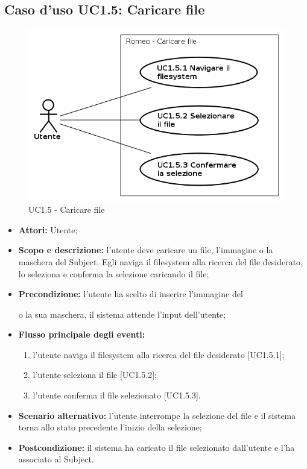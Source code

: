 \subsection{Caso d'uso UC1.5: Caricare file}
\begin{figure}[!h]
\begin{center}
\includegraphics[scale=0.6]{./img/Use_Case/UC1_5}
\caption{UC1.5 - Caricare file}
\end{center}
\end{figure}
\begin{itemize}
\item \textbf{Attori:} Utente;
\item \textbf{Scopo e descrizione:} l'utente deve caricare un file, l'immagine o la maschera\glossario{} del Subject\glossario{}. Egli naviga il filesystem alla ricerca del file desiderato, lo seleziona e conferma la selezione caricando il file;
\item \textbf{Precondizione:} l'utente ha scelto di inserire l'immagine del \subject{} o la sua maschera\glossario{}, il sistema attende l'input dell'utente;
\item \textbf{Flusso principale degli eventi:}
\begin{enumerate}
\item l'utente naviga il filesystem alla ricerca del file desiderato [UC1.5.1];
\item l'utente seleziona il file [UC1.5.2];
\item l'utente conferma il file selezionato [UC1.5.3].
\end{enumerate}
\item \textbf{Scenario alternativo:} l'utente interrompe la selezione del file e il sistema torna allo stato precedente l'inizio della selezione;
\item \textbf{Postcondizione:} il sistema ha caricato il file selezionato dall'utente e l'ha associato al Subject\glossario{}.
\end{itemize}

